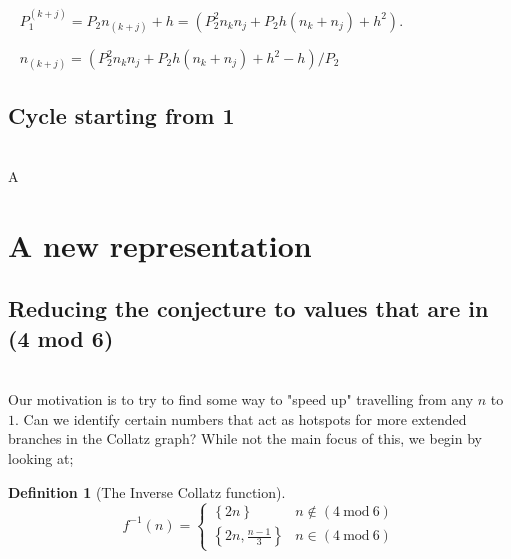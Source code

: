 \documentclass[12pt,a4paper]{amsart}
\numberwithin{equation}{section}
\theoremstyle{plain}
\theoremstyle{definition}
\newtheorem{Def}[Th]{Definition}
\begin{document}
~ $P^{\left ( k+j \right )}_{1} = P_{2}n_{\left ( k+j \right )} + h = \left ( P^{2}_{2}n_{k}n_{j} + P_{2}h\left ( n_{k} + n_{j} \right ) + h^{2} \right )$.

~ $n_{\left ( k+j \right )} = \left ( P^{2}_{2}n_{k}n_{j} + P_{2}h\left ( n_{k} + n_{j} \right ) + h^{2} - h \right ) / P_{2}$

\subsection{Cycle starting from 1} \hfill\\

A

\section{A new representation}

\subsection{Reducing the conjecture to values that are in (4 mod 6)} \hfill\\

Our motivation is to try to find some way to "speed up" travelling from any $n$ to $1$. Can we identify certain numbers that act as hotspots for more extended branches in the Collatz graph? While not the main focus of this, we begin by looking at;

\begin{Def}[The Inverse Collatz function]
\begin{equation}
f^{-1} \left ( n \right )=\left\{\begin{matrix}
\left \{ 2n \right \} & n \notin \left ( 4\:\mathrm{mod}\:6 \right ) \\ 
\left \{ 2n, \frac{n-1}{3} \right \} & n \in \left ( 4\:\mathrm{mod}\:6 \right )
\end{matrix}\right.
\end{equation}
\end{Def}
\end{document}
